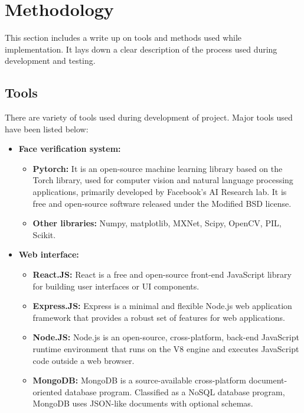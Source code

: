 \chapter{Methodology}
This section includes a write up on tools and methods used while implementation. It lays down a clear description of the process used during development and testing.
\section{Tools}
There are variety of tools used during development of project. Major tools used have been listed below:
\begin{itemize}
    \item \textbf{Face verification system:}
    \begin{itemize}
        \item \textbf{Pytorch:} It is an open-source machine learning library based on the Torch library, used for computer vision and natural language processing applications, primarily developed by Facebook's AI Research lab. It is free and open-source software released under the Modified BSD license.
        \item \textbf{Other libraries:} Numpy, matplotlib, MXNet, Scipy, OpenCV, PIL, Scikit.
    \end{itemize}
    \item \textbf{Web interface:}
    \begin{itemize}
        \item \textbf{React.JS:} React is a free and open-source front-end JavaScript library for building user interfaces or UI components.
        \item \textbf{Express.JS:} Express is a minimal and flexible Node.js web application framework that provides a robust set of features for web applications.
        \item \textbf{Node.JS:} Node.js is an open-source, cross-platform, back-end JavaScript runtime environment that runs on the V8 engine and executes JavaScript code outside a web browser.
        \item \textbf{MongoDB:} MongoDB is a source-available cross-platform document-oriented database program. Classified as a NoSQL database program, MongoDB uses JSON-like documents with optional schemas.
    \end{itemize}
\end{itemize}
